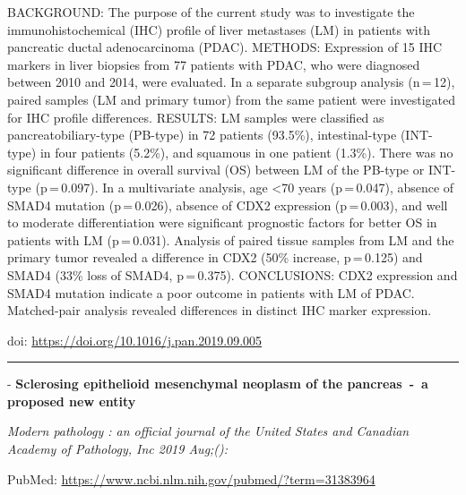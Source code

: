 \documentclass[
]{article}
\renewcommand{\linethickness}{0.05em}
\begin{document}
BACKGROUND: The purpose of the current study was to investigate the
immunohistochemical (IHC) profile of liver metastases (LM) in patients
with pancreatic ductal adenocarcinoma (PDAC). METHODS: Expression of 15
IHC markers in liver biopsies from 77 patients with PDAC, who were
diagnosed between 2010 and 2014, were evaluated. In a separate subgroup
analysis (n\,=\,12), paired samples (LM and primary tumor) from the same
patient were investigated for IHC profile differences. RESULTS: LM
samples were classified as pancreatobiliary-type (PB-type) in 72
patients (93.5\%), intestinal-type (INT-type) in four patients (5.2\%),
and squamous in one patient (1.3\%). There was no significant difference
in overall survival (OS) between LM of the PB-type or INT-type
(p\,=\,0.097). In a multivariate analysis, age \textless70 years
(p\,=\,0.047), absence of SMAD4 mutation (p\,=\,0.026), absence of CDX2
expression (p\,=\,0.003), and well to moderate differentiation were
significant prognostic factors for better OS in patients with LM
(p\,=\,0.031). Analysis of paired tissue samples from LM and the primary
tumor revealed a difference in CDX2 (50\% increase, p\,=\,0.125) and
SMAD4 (33\% loss of SMAD4, p\,=\,0.375). CONCLUSIONS: CDX2 expression
and SMAD4 mutation indicate a poor outcome in patients with LM of PDAC.
Matched-pair analysis revealed differences in distinct IHC marker
expression.

doi: \url{https://doi.org/10.1016/j.pan.2019.09.005}

\begin{center}\rule{0.5\linewidth}{\linethickness}\end{center}

- \textbf{Sclerosing epithelioid mesenchymal neoplasm of the
pancreas~-~a proposed new entity}

\emph{Modern pathology : an official journal of the United States and
Canadian Academy of Pathology, Inc 2019 Aug;():}

PubMed: \url{https://www.ncbi.nlm.nih.gov/pubmed/?term=31383964}
\end{document}
